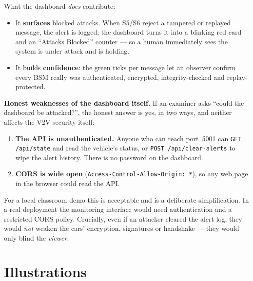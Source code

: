 \documentclass[11pt,a4paper]{report}
\begin{document}
\medskip
\noindent What the dashboard \emph{does} contribute:
\begin{itemize}
  \item It \textbf{surfaces} blocked attacks. When S5/S6 reject a tampered or
        replayed message, the alert is logged; the dashboard turns it into a
        blinking red card and an ``Attacks Blocked'' counter --- so a human
        immediately sees the system is under attack and is holding.
  \item It builds \textbf{confidence}: the green ticks per message let an
        observer confirm every BSM really was authenticated, encrypted,
        integrity-checked and replay-protected.
\end{itemize}

\medskip
\noindent\textbf{Honest weaknesses of the dashboard itself.} If an examiner asks
``could the dashboard be attacked?'', the honest answer is yes, in two ways, and
neither affects the V2V security itself:
\begin{enumerate}
  \item \textbf{The API is unauthenticated.} Anyone who can reach port~5001 can
        \texttt{GET /api/state} and read the vehicle's status, or
        \texttt{POST /api/clear-alerts} to wipe the alert history. There is no
        password on the dashboard.
  \item \textbf{CORS is wide open} (\texttt{Access-Control-Allow-Origin: *}), so
        any web page in the browser could read the API.
\end{enumerate}
For a local classroom demo this is acceptable and is a deliberate simplification.
In a real deployment the monitoring interface would need authentication and a
restricted CORS policy. Crucially, even if an attacker cleared the alert log,
they would \emph{not} weaken the cars' encryption, signatures or handshake ---
they would only blind the \emph{viewer}.

\section{Illustrations}
\end{document}
